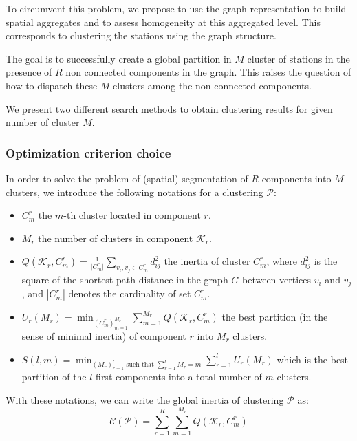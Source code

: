 To circumvent this problem, we propose to use the graph representation to build spatial aggregates and to assess homogeneity at this aggregated level. This corresponds to clustering the stations using the graph structure.

The goal is to successfully create a global partition in $M$ cluster of stations in the presence of $R$ non connected components in the graph. This raises the question of how to dispatch these $M$ clusters among the non connected components. 

We present two different search methods to obtain clustering results for given number of cluster $M$. 

\subsubsection{Optimization criterion choice}

In order to solve the problem of (spatial) segmentation of $R$ components into $M$ clusters, we introduce the following notations for a clustering $\mathcal{P}$: 
\begin{itemize}
    \item $C_m^r$ the $m$-th cluster located in component $r$.
    \item $M_r$ the number of clusters in component $\mathcal{K}_r$.
    \item $\displaystyle Q(\mathcal{K}_r,C_m^r) = \frac{1}{\lvert C_m^r\rvert}\sum_{v_i,v_j \in C_m^r}d_{ij}^2$ the inertia of cluster $C^r_m$, where $d^2_{ij}$ is the square of the shortest path distance in the graph $G$ between vertices $v_i$ and $v_j$, and $|C_m^r|$ denotes the cardinality of set $C_m^r$.
    \item $\displaystyle U_r(M_r) = \min_{(C_m^r)_{m=1}^{M_r}}\sum_{m = 1}^{M_r}Q(\mathcal{K}_r,C_m^r)$ the best partition (in the sense of minimal inertia) of component $r$ into $M_r$ clusters. 
    \item $\displaystyle S(l,m) = \min_{(M_r)_{r=1}^l \text{ such that } \sum_{r=1}^l M_r = m}\sum_{r=1}^lU_r(M_r)$ which is the best partition of the $l$ first components into a total number of $m$ clusters.
\end{itemize} 

With these notations, we can write the global inertia of clustering $\mathcal{P}$ as: 
\begin{equation}\label{global:inertia}
\mathcal{C}(\mathcal{P}) = \sum_{r=1}^R\sum_{m=1}^{M_r}Q(\mathcal{K}_r,C^r_m)
\end{equation}

